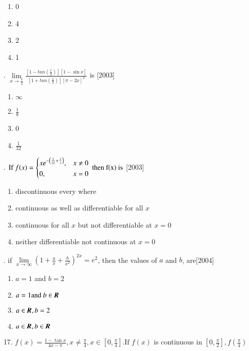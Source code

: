 \documentclass[journal,12pt,twocolumn]{IEEEtran}
\theoremstyle{remark}
\begin{document}
\begin{enumerate}
    \item 0
    \item 4
    \item 2
    \item 1\\[2pt]
\end{enumerate}

. $\displaystyle \lim\limits_{x\to\frac{\pi}{2}}\frac{\left[1-tan\left(\frac{x}{2}\right)\right]\left[1-\sin x\right]}{ \left[1+tan\left(\frac{x}{2}\right)\right]\left[\pi-2x\right]^3}$ is \hfill [2003]

\begin{enumerate}
    \item $\infty$
    \item $\frac{1}{8}$
    \item 0
    \item $\frac{1}{32}$\\[2pt]
\end{enumerate}

. $\displaystyle \text{If } f(x)=
    \begin{dcases}
        xe^{-\left( \frac{1}{|x|} + \frac{1}{x} \right)},&x\neq 0\\ 
        0                                    ,&x = 0
    \end{dcases}
   \text{ then f(x) is}
$ \hfill [2003]

\begin{enumerate}
    \item discontinuous every where
    \item continuous as well as differentiable for all $x$
    \item continuous for all $x$ but not differentiable at $x=0$
    \item neither differentiable not continuous at $x=0$
\end{enumerate}

. if $\displaystyle \lim\limits_{x\to\infty}\left(1+\frac{a}{x}+\frac{b}{x^2}\right)^{2x}=e^2$, then the values of $a$ and $b$, are\hfill [2004]

\begin{enumerate}
    \item $a=1$ and $b=2$
    \item $a=1 \text{and }b\in \textbf{\textit{R}}$
    \item $a\in \textbf{\textit{R}},b=2$
    \item $a\in \textbf{\textit{R}},b\in \textbf{\textit{R}}$\\[2pt]
\end{enumerate}
17. $\displaystyle f(x)=\frac{1-\tan x}{4x-\pi}, x\neq\frac{\pi}{4},x\in\left[0,\frac{\pi}{4}\right]\text{.If }f(x)$ is continuous in $\displaystyle\left[0,\frac{\pi}{2}\right],$$f\left(\frac{\pi}{4}\right)$
\end{document}
